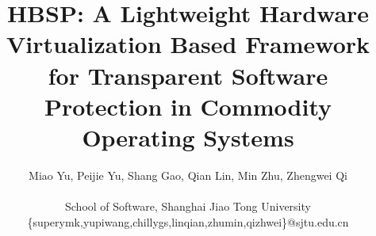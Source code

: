 \documentclass[conference]{IEEEtran}
\begin{document}
%
\title{HBSP: A Lightweight Hardware Virtualization Based Framework for Transparent Software Protection in Commodity Operating Systems}


\iffalse
\author{
\IEEEauthorblockN{Miao Yu}
\IEEEauthorblockA{School of Software,\\Shanghai Jiaotong University\\
Email: yumiao@sjtu.edu.cn}
\and
\IEEEauthorblockN{Peijie Yu}
\IEEEauthorblockA{School of Software,\\Shanghai Jiao Tong University\\
Email: yupeijie@sjtu.edu.cn} \and \IEEEauthorblockN{Shang Gao}
\IEEEauthorblockA{School of Software,\\Shanghai Jiaotong
University\\Email: gaoshang@sjtu.edu.cn}}
\fi

\author{Miao Yu, Peijie Yu, Shang Gao, Qian Lin, Min Zhu, Zhengwei
Qi\\ \\
School of Software, Shanghai Jiao Tong University\\
\{superymk,yupiwang,chillygs,linqian,zhumin,qizhwei\}@sjtu.edu.cn}


\maketitle
\end{document}
